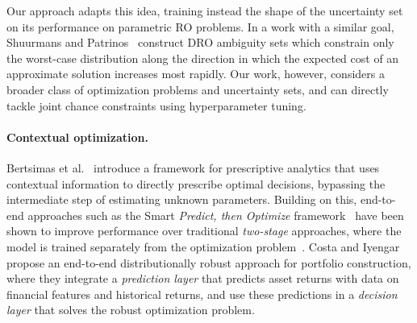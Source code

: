 Our approach adapts this idea, training instead the shape of the uncertainty set on its performance on parametric \gls{RO} problems.
In a work with a similar goal, Shuurmans and Patrinos~\cite{schuurmans2023distributionally} construct \gls{DRO} ambiguity sets which constrain only the worst-case distribution along the direction in which the expected cost of an approximate solution increases most rapidly.
Our work, however, considers a broader class of optimization problems and uncertainty sets, and can directly tackle joint chance constraints using hyperparameter tuning.


\paragraph{Contextual optimization. }
Bertsimas et al.~\cite{bertsimas2020predictive} introduce a framework for prescriptive analytics that uses contextual information to directly prescribe optimal decisions, bypassing the intermediate step of estimating unknown parameters.
Building on this, end-to-end approaches such as the Smart {\it Predict, then Optimize} framework~\citep{predict_opt} have been shown to improve performance over traditional {\it two-stage} approaches, where the model is trained separately from the optimization problem~\citep{end-port}.
Costa and Iyengar~\cite{end-port} propose an end-to-end distributionally robust approach for portfolio construction, where they integrate a {\it prediction layer} that predicts asset returns with data on financial features and historical returns, and use these predictions in a {\it decision layer} that solves the robust optimization problem.
